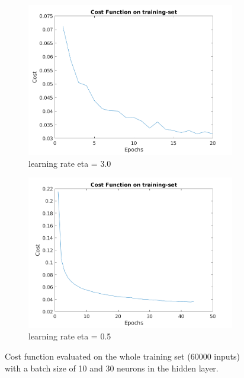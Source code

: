 \begin{figure}[t!]
\centering
    \begin{subfigure}[t]{0.49\textwidth}
        \centering
        \includegraphics[width=1.1\textwidth]{test_src/img/eta3_trainset}
        \caption{learning rate eta = 3.0}
    \end{subfigure}
    \begin{subfigure}[t]{0.49\textwidth}
        \centering
        \includegraphics[width=1.1\textwidth]{test_src/img/eta05_trainset}
        \caption{learning rate eta = 0.5}
    \end{subfigure}
    \caption{Cost function evaluated on the whole training set (60000 inputs) with a batch size of 10 and 30 neurons in the hidden layer. }
    \label{fig:costTrainSet}
\end{figure}

